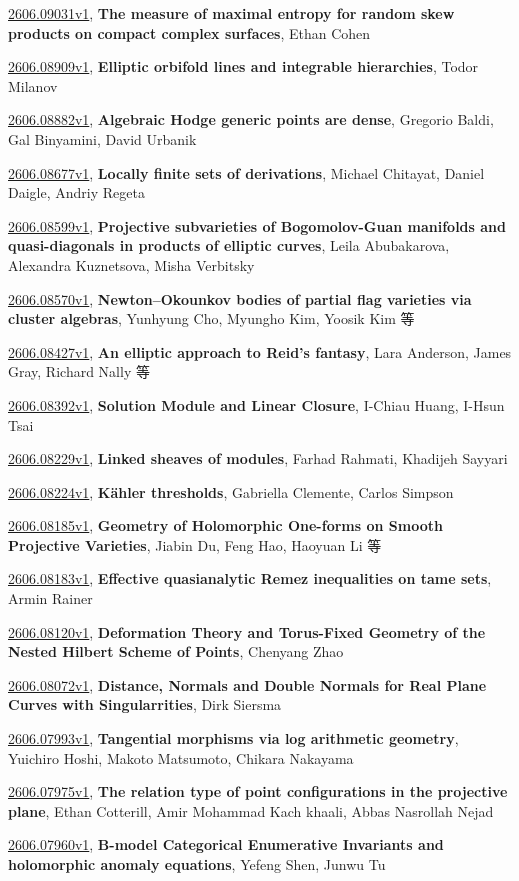\documentclass[9pt, a4paper]{article}
\theoremstyle{plain}
\theoremstyle{definition}
\theoremstyle{remark}
\newcommand{\arxiv}[3]{\href{https://arxiv.org/abs/#1}{#1}, \textbf{\textcolor{arxivblue}{#2}}, #3}
\begin{document}
\arxiv{2606.09031v1}{The measure of maximal entropy for random skew products on compact complex surfaces}{Ethan Cohen}

\arxiv{2606.08909v1}{Elliptic orbifold lines and integrable hierarchies}{Todor Milanov}

\arxiv{2606.08882v1}{Algebraic Hodge generic points are dense}{Gregorio Baldi, Gal Binyamini, David Urbanik}

\arxiv{2606.08677v1}{Locally finite sets of derivations}{Michael Chitayat, Daniel Daigle, Andriy Regeta}

\arxiv{2606.08599v1}{Projective subvarieties of Bogomolov-Guan manifolds and quasi-diagonals in products of elliptic curves}{Leila Abubakarova, Alexandra Kuznetsova, Misha Verbitsky}

\arxiv{2606.08570v1}{Newton--Okounkov bodies of partial flag varieties via cluster algebras}{Yunhyung Cho, Myungho Kim, Yoosik Kim 等}

\arxiv{2606.08427v1}{An elliptic approach to Reid's fantasy}{Lara Anderson, James Gray, Richard Nally 等}

\arxiv{2606.08392v1}{Solution Module and Linear Closure}{I-Chiau Huang, I-Hsun Tsai}

\arxiv{2606.08229v1}{Linked sheaves of modules}{Farhad Rahmati, Khadijeh Sayyari}

\arxiv{2606.08224v1}{Kähler thresholds}{Gabriella Clemente, Carlos Simpson}

\arxiv{2606.08185v1}{Geometry of Holomorphic One-forms on Smooth Projective Varieties}{Jiabin Du, Feng Hao, Haoyuan Li 等}

\arxiv{2606.08183v1}{Effective quasianalytic Remez inequalities on tame sets}{Armin Rainer}

\arxiv{2606.08120v1}{Deformation Theory and Torus-Fixed Geometry of the Nested Hilbert Scheme of Points}{Chenyang Zhao}

\arxiv{2606.08072v1}{Distance, Normals and Double Normals for Real Plane Curves with Singularrities}{Dirk Siersma}

\arxiv{2606.07993v1}{Tangential morphisms via log arithmetic geometry}{Yuichiro Hoshi, Makoto Matsumoto, Chikara Nakayama}

\arxiv{2606.07975v1}{The relation type of point configurations in the projective plane}{Ethan Cotterill, Amir Mohammad Kach khaali, Abbas Nasrollah Nejad}

\arxiv{2606.07960v1}{B-model Categorical Enumerative Invariants and holomorphic anomaly equations}{Yefeng Shen, Junwu Tu}
\end{document}
